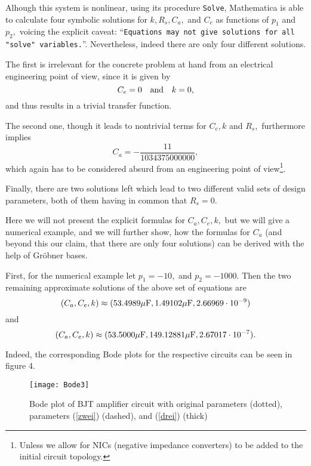 \documentclass[10pt,twocolumn,pagenumbers]{IEEEtran}
\begin{document}
\noindent
Alhough this system is nonlinear, using its procedure {\tt Solve}, Mathematica is able to calculate four symbolic solutions for $k, R_s, C_a,$ and $C_e$ as functions of $p_1$ and $p_2,$ voicing the explicit caveat: ``{\tt Equations may not give solutions for all "solve" variables.}''. Nevertheless, indeed there are only four different solutions.

The first is irrelevant for the concrete problem at hand from an electrical engineering point of view, since it is given by 
\begin{equation}
C_e=0\quad \hbox{and}\quad k=0,
\end{equation}
and thus results in a trivial transfer function.

The second one, though it leads to nontrivial terms for $C_e,k$ and $R_s,$ furthermore implies
\begin{equation}
C_a=-\frac{11}{1034375000000},
\label{mies}
\end{equation}
which again has to be considered absurd from an engineering point of view\footnote{Unless we allow for NICs (negative impedance converters) to be added to the initial circuit topology.}.

Finally, there are two solutions left which lead to two different valid sets of design parameters, both of them having in common that $R_s=0.$ 

Here we will not present the explicit formulas for $C_a, C_e, k,$ but we will give a numerical example, and we will further show, how the formulas for $C_a$ (and beyond this our claim, that there are only four solutions) can be derived with the help of Gr\"obner bases.  

First, for the numerical example let $p_1=-10,$ and $p_2=-1000.$ Then the two remaining approximate solutions of the above set of equations are  
\begin{equation}
(C_a, C_e, k) \approx (53.4989\mu\hbox{F}, 1.49102\mu\hbox{F}, 2.66969\cdot 10^{-9})
\label{zwei}
\end{equation}
and
\begin{equation}
(C_a, C_e, k) \approx (53.5000\mu\hbox{F}, 149.12881\mu\hbox{F}, 2.67017\cdot10^{-7}).
\label{drei}
\end{equation}

Indeed, the corresponding Bode plots for the respective circuits can be seen in figure 4.
\medskip
\begin{figure}[!ht]
\begin{center}
\texttt{[image: Bode3]}
\vskip -0.4cm
\caption{Bode plot of BJT amplifier circuit with original parameters (dotted), parameters (\ref{zwei}) (dashed), and (\ref{drei}) (thick)}
\end{center}
\label{Bode3}
\end{figure}
\end{document}
